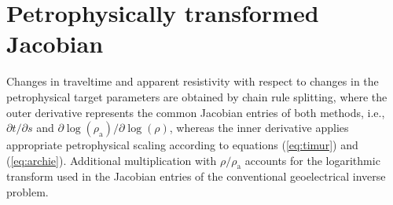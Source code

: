 \documentclass[extra]{gji}
\begin{document}



\appendix
\section{Petrophysically transformed Jacobian}\label{appendix}
Changes in traveltime and apparent resistivity with respect to changes in the petrophysical target parameters are obtained by chain rule splitting, where the outer derivative represents the common Jacobian entries of both methods, i.e., $\partial t/\partial s$ and $\partial \log(\rho_\text{a})/\partial \log(\rho)$, whereas the inner derivative applies appropriate petrophysical scaling according to equations (\ref{eq:timur}) and (\ref{eq:archie}).
Additional multiplication with $\rho/\rho_\text{a}$ accounts for the logarithmic transform used in the Jacobian entries of the conventional geoelectrical inverse problem.
\end{document}
